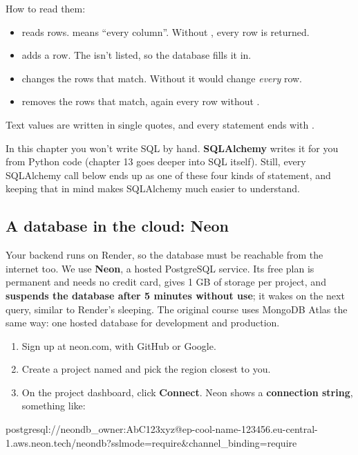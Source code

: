 How to read them:
\begin{itemize}
\item {} reads rows. \cd{*} means ``every column''. Without , every row is returned.
\item {} adds a row. The  isn't listed, so the database fills it in.
\item {} changes the rows that match. Without  it would change \emph{every} row.
\item {} removes the rows that match, again every row without .
\end{itemize}
Text values are written in single quotes, and every statement ends with \cd{;}.

In this chapter you won't write SQL by hand. \textbf{SQLAlchemy} writes it for you from Python code (chapter 13 goes deeper into SQL itself). Still, every SQLAlchemy call below ends up as one of these four kinds of statement, and keeping that in mind makes SQLAlchemy much easier to understand.

\subsection{A database in the cloud: Neon}

Your backend runs on Render, so the database must be reachable from the internet too. We use \textbf{Neon}, a hosted PostgreSQL service. Its free plan is permanent and needs no credit card, gives 1 GB of storage per project, and \textbf{suspends the database after 5 minutes without use}; it wakes on the next query, similar to Render's sleeping. The original course uses MongoDB Atlas the same way: one hosted database for development and production.

\begin{enumerate}
\item Sign up at neon.com, with GitHub or Google.
\item Create a project named  and pick the region closest to you.
\item On the project dashboard, click \textbf{Connect}. Neon shows a \textbf{connection string}, something like:
\end{enumerate}

\begin{code}
postgresql://neondb_owner:AbC123xyz@ep-cool-name-123456.eu-central-1.aws.neon.tech/neondb?sslmode=require&channel_binding=require
\end{code}

